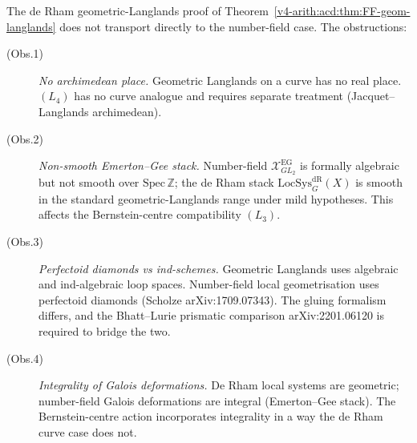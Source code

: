\begin{theorem}
\label{v4-arith:acd:thm:transport-obstructions}
The de Rham geometric-Langlands proof of
Theorem~\ref{v4-arith:acd:thm:FF-geom-langlands} does not transport directly
to the number-field case. The obstructions:
\begin{description}
\item[(Obs.1)] \emph{No archimedean place.} Geometric Langlands on a
curve has no real place. \((L_{4})\) has no curve analogue
and requires separate treatment (Jacquet--Langlands archimedean).
\item[(Obs.2)] \emph{Non-smooth Emerton--Gee stack.} Number-field
\(\mathcal{X}^{\mathrm{EG}}_{GL_{2}}\) is formally algebraic but not
smooth over \(\mathrm{Spec}\,\mathbb{Z}\); the de Rham stack
\(\mathrm{LocSys}^{\mathrm{dR}}_{G}(X)\) is smooth in the standard
geometric-Langlands range
under mild hypotheses. This affects the Bernstein-centre
compatibility \((L_{3})\).
\item[(Obs.3)] \emph{Perfectoid diamonds vs ind-schemes.}
Geometric Langlands uses algebraic and ind-algebraic loop spaces.
Number-field local geometrisation uses perfectoid diamonds (Scholze
arXiv:1709.07343). The gluing formalism differs, and the
Bhatt--Lurie prismatic comparison arXiv:2201.06120 is required to
bridge the two.
\item[(Obs.4)] \emph{Integrality of Galois deformations.}
De Rham local systems are geometric; number-field Galois
deformations are integral (Emerton--Gee stack). The Bernstein-centre
action incorporates integrality in a way the de Rham curve case
does not.
\end{description}
\end{theorem}

